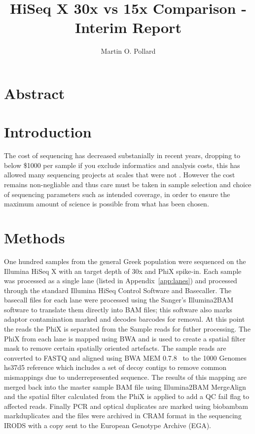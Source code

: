 \documentclass{article}
\title{HiSeq X 30x vs 15x Comparison - Interim Report}
\author{Martin O. Pollard}
\begin{document}
  \maketitle
  \newpage
  \tableofcontents
  \newpage
  \section{Abstract}

  \section{Introduction}

  The cost of sequencing has decreased substanially in recent years, dropping to below \$1000 per sample if you exclude informatics and analysis costs, this has allowed many sequencing projects at scales that were not . However
  the cost remains non-negliable and thus care must be taken in sample selection and choice of sequencing parameters such as intended coverage, in
  order to ensure the maximum amount of science is possible from what has been chosen.

  \section{Methods}
  One hundred samples from the general Greek population were sequenced on the Illumina HiSeq X with an target depth of 30x and PhiX spike-in. Each sample was processed as a single lane (listed in Appendix~\ref{app:lanes}) and processed through the standard Illumina HiSeq Control Software and Basecaller. The basecall files for each lane were processed using the Sanger's Illumina2BAM software to translate them directly into BAM files; this software also marks adaptor contamination marked and decodes barcodes for removal. At this point the reads the PhiX is separated from the Sample reads for futher processing. The PhiX from each lane is mapped using BWA and is used to create a spatial filter mask to remove certain spatially oriented artefacts. The sample reads are converted to FASTQ and aligned using BWA MEM 0.7.8~\cite{bwamem} to the 1000 Genomes hs37d5 reference which includes a set of decoy contigs to remove common mismappings due to underrepresented sequence.  The results of this mapping are merged back into the master sample BAM file using Illumina2BAM MergeAlign and the spatial filter calculated from the PhiX is applied to add a QC fail flag to affected reads. Finally PCR and optical duplicates are marked using biobambam markduplicates and the files were archived in CRAM format in the sequencing IRODS with a copy sent to the European Genotype Archive (EGA).
\end{document}

